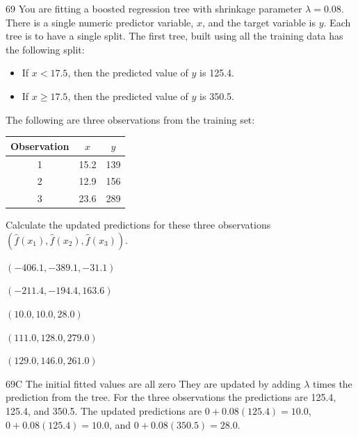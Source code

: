 \begin{question}{69}
You are fitting a boosted regression tree with shrinkage parameter $\lambda = 0.08$. There is a single numeric predictor variable, $x$, and the target variable is $y$. Each tree is to have a single split. The first tree, built using all the training data has the following split:
\begin{itemize}
\item If $x < 17.5$, then the predicted value of $y$ is 125.4.
\item If $x \geqslant 17.5$, then the predicted value of $y$ is 350.5.
\end{itemize}
The following are three observations from the training set:
\begin{center}
\begin{tabular}{|c|c|c|}
\hline
Observation & $x$ & $y$ \\ \hline
1 & 15.2 & 139 \\ \hline
2 & 12.9 & 156 \\ \hline
3 & 23.6 & 289 \\ \hline
\end{tabular}
\end{center}

Calculate the updated predictions for these three observations $(\hat{f}(x_1), \hat{f}(x_2), \hat{f}(x_3))$.

\begin{choices}
\item $(-406.1, -389.1, -31.1)$
\item $(-211.4, -194.4, 163.6)$
\item $(10.0, 10.0, 28.0)$
\item $(111.0, 128.0, 279.0)$
\item $(129.0, 146.0, 261.0)$
\end{choices}
\end{question}
\begin{solution}{69}{C}
The initial fitted values are all zero They are updated by adding $\lambda$ times the prediction from the tree. For the three observations the predictions are 125.4, 125.4, and 350.5. The updated predictions are $0 + 0.08(125.4) = 10.0$, $0 + 0.08(125.4) = 10.0$, and $0 + 0.08(350.5) = 28.0$.
\end{solution}

